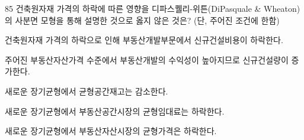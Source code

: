 \begin{question}{85}
건축원자재 가격의 하락에 따른 영향을 디파스퀠리-위튼(DiPasquale \& Wheaton)의 사분면 모형을 통해 설명한 것으로 옳지 않은 것은? (단, 주어진 조건에 한함)
\begin{choices}
  \item 건축원자재 가격의 하락으로 인해 부동산개발부문에서 신규건설비용이 하락한다.
  \item 주어진 부동산자산가격 수준에서 부동산개발의 수익성이 높아지므로 신규건설량이 증가한다.
  \item 새로운 장기균형에서 균형공간재고는 감소한다.
  \item 새로운 장기균형에서 부동산공간시장의 균형임대료는 하락한다.
  \item 새로운 장기균형에서 부동산자산시장의 균형가격은 하락한다.
\end{choices}
\end{question}
